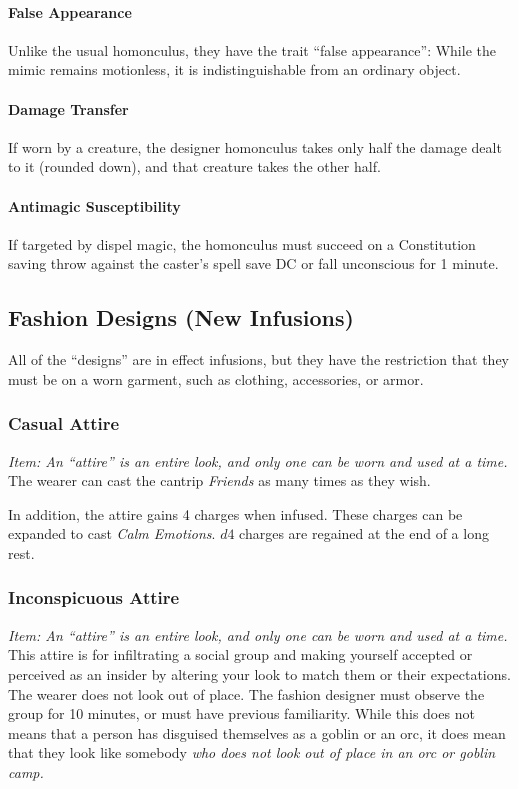 \documentclass[twocolumn]{dndbook}
\begin{document}
\paragraph{False Appearance}
Unlike the usual homonculus, they have the trait ``false appearance'':
While the mimic remains motionless, it is indistinguishable from an ordinary object.

\paragraph{Damage Transfer}
If worn by a creature, the designer homonculus takes only half the damage dealt to it (rounded down), and that creature takes the other half.

\paragraph{Antimagic Susceptibility}
If targeted by dispel magic, the homonculus must succeed on a Constitution saving throw against the caster's spell save DC or fall unconscious for 1 minute.


\subsection{Fashion Designs (New Infusions)}

All of the ``designs'' are in effect infusions, but they have the restriction that they must be on a worn garment, such as clothing, accessories, or armor.\par

\subsubsection{Casual Attire}
\emph{Item: An ``attire'' is an entire look, and only one can be worn and used at a time.}
The wearer can cast the cantrip \emph{Friends} as many times as they wish.\par

In addition, the attire gains 4 charges when infused.
These charges can be expanded to cast \emph{Calm Emotions}.
$d4$ charges are regained at the end of a long rest.

\subsubsection{Inconspicuous Attire}
\emph{Item: An ``attire'' is an entire look, and only one can be worn and used at a time.}
This attire is for infiltrating a social group and making yourself accepted or perceived as an insider by altering your look to match them or their expectations.
The wearer does not look out of place.
The fashion designer must observe the group for 10 minutes, or must have previous familiarity.
While this does not means that a person has disguised themselves as a goblin or an orc,
it does mean that they look like somebody \emph{who does not look out of place in an orc or goblin camp.}
\end{document}
